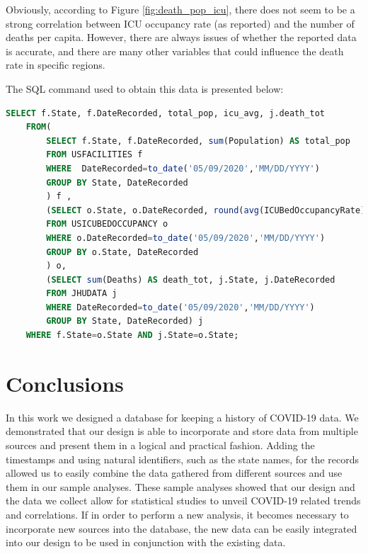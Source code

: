 \documentclass[11pt]{article}
\begin{document}
\noindent
Obviously, according to Figure \ref{fig:death_pop_icu}, there does not seem to be a strong correlation between ICU occupancy rate (as reported) and the number of deaths per capita. However, there are always issues of whether the reported data is accurate, and there are many other variables that could influence the death rate in specific regions.
\pagebreak

\noindent
The SQL command used to obtain this data is presented below:
\begin{lstlisting}[language=SQL,
        deletekeywords={IDENTITY,INT},
        morekeywords={clustered},    
        framesep=10pt,
        framextopmargin=10pt]
    SELECT f.State, f.DateRecorded, total_pop, icu_avg, j.death_tot 
    FROM(
        SELECT f.State, f.DateRecorded, sum(Population) AS total_pop 
        FROM USFACILITIES f 
        WHERE  DateRecorded=to_date('05/09/2020','MM/DD/YYYY')  
        GROUP BY State, DateRecorded
        ) f , 
        (SELECT o.State, o.DateRecorded, round(avg(ICUBedOccupancyRate),3) AS     icu_avg 
        FROM USICUBEDOCCUPANCY o 
        WHERE o.DateRecorded=to_date('05/09/2020','MM/DD/YYYY')  
        GROUP BY o.State, DateRecorded
        ) o, 
        (SELECT sum(Deaths) AS death_tot, j.State, j.DateRecorded 
        FROM JHUDATA j 
        WHERE DateRecorded=to_date('05/09/2020','MM/DD/YYYY')   
        GROUP BY State, DateRecorded) j 
    WHERE f.State=o.State AND j.State=o.State;\end{lstlisting}

\pagebreak

\section{Conclusions}
\label{sec:conclusion}

\noindent
In this work we designed a database for keeping a history of COVID-19 data. We demonstrated that our design is able to incorporate and store data from multiple sources and present them in a logical and practical fashion. Adding the timestamps and using natural identifiers, such as the state names, for the records allowed us to easily combine the data gathered from different sources and use them in our sample analyses. These sample analyses showed that our design and the data we collect allow for statistical studies to unveil COVID-19 related trends and correlations. If in order to perform a new analysis, it becomes necessary to incorporate new sources into the database, the new data can be easily integrated into our design to be used in conjunction with the existing data.\\
\end{document}

